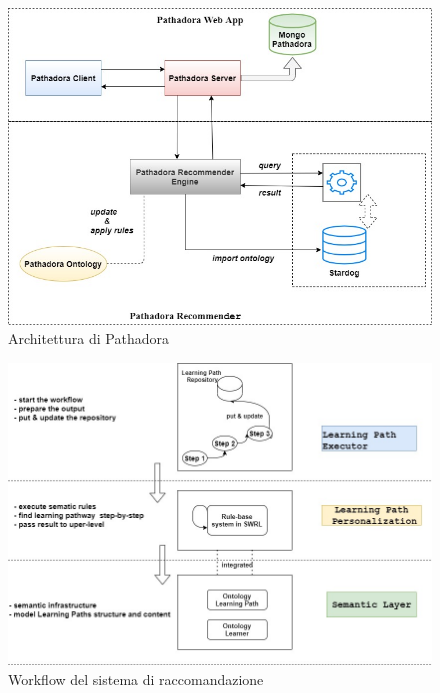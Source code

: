 \begin{figure}[H]
\centering
\includegraphics[scale=0.4]{res/pathadora-arch.jpg}
\caption{Architettura di Pathadora}
\label{fig:pathadora-arch}
\end{figure}

\begin{figure}[H]
\centering
\includegraphics[scale=0.4]{res/diag-layers.jpg}
\caption{Workflow del sistema di raccomandazione}
\label{fig:diag-layers}
\end{figure}

